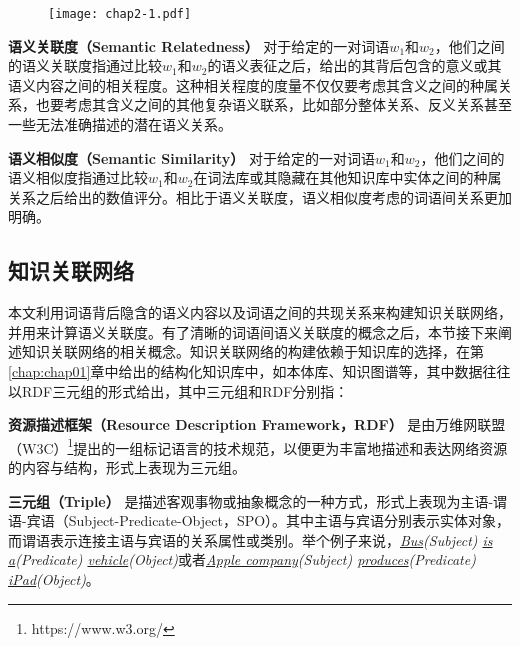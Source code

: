 \begin{figure}[!htb]
    \centerline{\texttt{[image: chap2-1.pdf]}}
    \label{chap2-1}
\end{figure}

\begin{definition}
    \label{sr}
    {\bf 语义关联度（Semantic Relatedness）}
    对于给定的一对词语$w_1$和$w_2$，他们之间的语义关联度指通过比较$w_1$和$w_2$的语义表征之后，给出的其背后包含的意义或其语义内容之间的相关程度。这种相关程度的度量不仅仅要考虑其含义之间的种属关系，也要考虑其含义之间的其他复杂语义联系，比如部分整体关系、反义关系甚至一些无法准确描述的潜在语义关系。
\end{definition}

\begin{definition}
    \label{ss}
    {\bf 语义相似度（Semantic Similarity）}
    对于给定的一对词语$w_1$和$w_2$，他们之间的语义相似度指通过比较$w_1$和$w_2$在词法库或其隐藏在其他知识库中实体之间的种属关系之后给出的数值评分。相比于语义关联度，语义相似度考虑的词语间关系更加明确。
\end{definition}

\subsection{知识关联网络}
本文利用词语背后隐含的语义内容以及词语之间的共现关系来构建知识关联网络，并用来计算语义关联度。有了清晰的词语间语义关联度的概念之后，本节接下来阐述知识关联网络的相关概念。知识关联网络的构建依赖于知识库的选择，在第\ref{chap:chap01}章中给出的结构化知识库中，如本体库、知识图谱等，其中数据往往以RDF三元组的形式给出，其中三元组和RDF分别指：

\begin{definition}
    \label{rdf}
    {\bf 资源描述框架（Resource Description Framework，RDF）}
    是由万维网联盟（W3C）\footnote{https://www.w3.org/}提出的一组标记语言的技术规范，以便更为丰富地描述和表达网络资源的内容与结构，形式上表现为三元组。
\end{definition}

\begin{definition}
    \label{triple}
    {\bf 三元组（Triple）}
    是描述客观事物或抽象概念的一种方式，形式上表现为主语-谓语-宾语（Subject-Predicate-Object，SPO）。其中主语与宾语分别表示实体对象，而谓语表示连接主语与宾语的关系属性或类别。举个例子来说，\emph{\underline{Bus}(Subject) \underline{is a}(Predicate) \underline{vehicle}(Object)}或者\emph{\underline{Apple company}(Subject) \underline{produces}(Predicate) \underline{iPad}(Object)}。
\end{definition}

